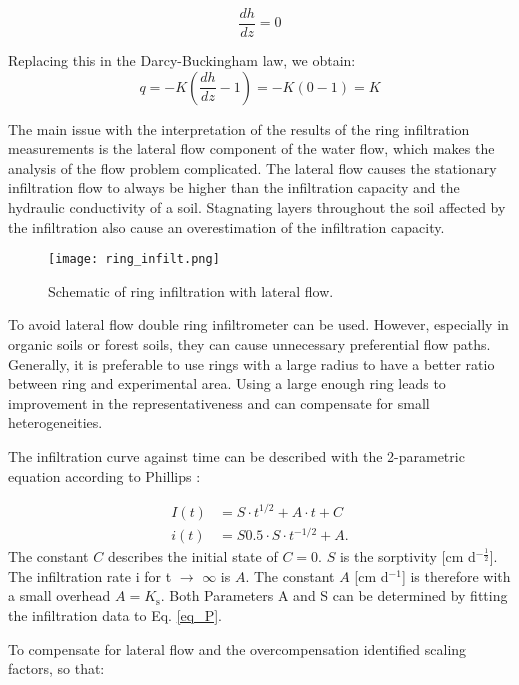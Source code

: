 \documentclass[
10pt, %
a4paper, %
oneside, %
headinclude,footinclude, %
BCOR5mm, %
]{scrartcl}
\begin{document}
\begin{equation}
\frac{dh}{dz}=0
\end{equation}

Replacing this in the Darcy-Buckingham law, we obtain:
\begin{equation}
q=-K (\frac{dh}{dz}-1)=-K(0-1)=K
\end{equation}

The main issue with the interpretation of the results of the ring infiltration measurements is the lateral flow component of the water flow, which makes the analysis of the flow problem complicated.
The lateral flow causes the stationary infiltration flow to always be higher than the infiltration capacity and the hydraulic conductivity of a soil. Stagnating layers throughout the soil affected by the infiltration also cause an overestimation of the infiltration capacity.

\begin{figure}[!h]
	\centering
	\texttt{[image: ring\_infilt.png]}
	\caption{\label{ring}Schematic of ring infiltration with lateral flow.}
\end{figure}


To avoid lateral flow double ring infiltrometer can be used. However, especially in organic soils or forest soils, they can cause unnecessary preferential flow paths. Generally, it is preferable to use rings with a large radius to have a better ratio between ring and experimental area. Using a large enough ring leads to improvement in the representativeness and can compensate for small heterogeneities.

The infiltration curve against time can be described with the 2-parametric equation according to Phillips \cite{philip1957}:

\begin{equation}\label{eq_P}
\begin{split}
I(t)&= S\cdot t^{1/2}+A\cdot t +C \\
i(t)&= S0.5 \cdot S \cdot t^{-1/2}+A.
\end{split}
\end{equation}
The constant $C$ describes the initial state of $C=0$. $S$ is the sorptivity [cm d$^{-\frac{1}{2}}$].
The infiltration rate i for t $\rightarrow$ $\infty$ is $A$. The constant $A$ [cm d$^{-1}$] is therefore with a small overhead $A=K_\mathrm{s}$. Both Parameters A and S can be determined by fitting the infiltration data to Eq. \ref{eq_P}.

To compensate for lateral flow and the overcompensation \cite{wu1997generalized} identified scaling factors, so that:
\end{document}
